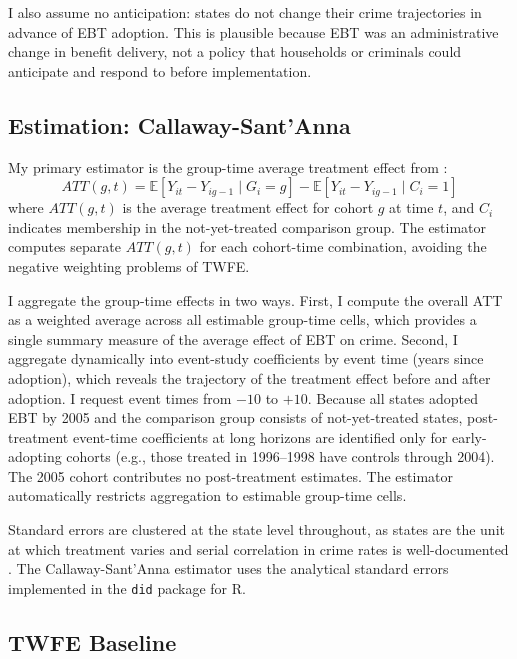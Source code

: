 \documentclass[12pt]{article}
\newcommand{\E}{\mathbb{E}}
\begin{document}
I also assume no anticipation: states do not change their crime trajectories in advance of EBT adoption. This is plausible because EBT was an administrative change in benefit delivery, not a policy that households or criminals could anticipate and respond to before implementation.

\subsection{Estimation: Callaway-Sant'Anna}

My primary estimator is the group-time average treatment effect from \citet{callaway2021difference}:
\begin{equation}
ATT(g, t) = \E[Y_{it} - Y_{ig-1} \mid G_i = g] - \E[Y_{it} - Y_{ig-1} \mid C_i = 1]
\end{equation}
where $ATT(g, t)$ is the average treatment effect for cohort $g$ at time $t$, and $C_i$ indicates membership in the not-yet-treated comparison group. The estimator computes separate $ATT(g,t)$ for each cohort-time combination, avoiding the negative weighting problems of TWFE.

I aggregate the group-time effects in two ways. First, I compute the overall ATT as a weighted average across all estimable group-time cells, which provides a single summary measure of the average effect of EBT on crime. Second, I aggregate dynamically into event-study coefficients by event time (years since adoption), which reveals the trajectory of the treatment effect before and after adoption. I request event times from $-10$ to $+10$. Because all states adopted EBT by 2005 and the comparison group consists of not-yet-treated states, post-treatment event-time coefficients at long horizons are identified only for early-adopting cohorts (e.g., those treated in 1996--1998 have controls through 2004). The 2005 cohort contributes no post-treatment estimates. The estimator automatically restricts aggregation to estimable group-time cells.

Standard errors are clustered at the state level throughout, as states are the unit at which treatment varies and serial correlation in crime rates is well-documented \citep{levitt1996effect}. The Callaway-Sant'Anna estimator uses the analytical standard errors implemented in the \texttt{did} package for R.

\subsection{TWFE Baseline}
\end{document}
